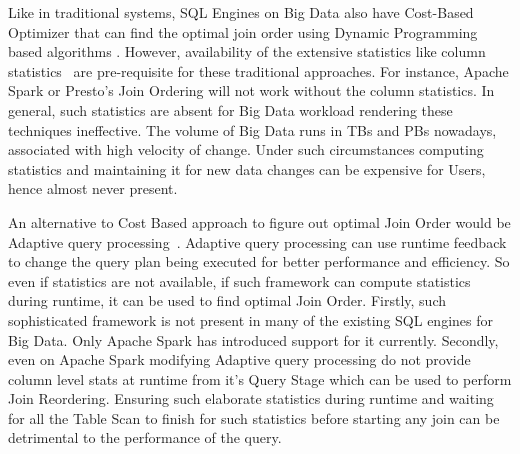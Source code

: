 \documentclass[conference]{IEEEtran}
\begin{document}
Like in traditional systems, SQL Engines on Big Data also have Cost-Based Optimizer that can find the optimal join order using Dynamic Programming based algorithms \cite{b1}. However, availability of the extensive statistics like column statistics~\cite{b11} are pre-requisite for these traditional approaches. For instance, Apache Spark or Presto's Join Ordering will not work without the column statistics. In general, such statistics are absent for Big Data workload rendering these techniques ineffective. The volume of Big Data runs in TBs and PBs nowadays, associated with high velocity of change. Under such circumstances  computing statistics and maintaining it for new data changes can be expensive for Users, hence almost never present.

An alternative to Cost Based approach to figure out optimal Join Order would be Adaptive query processing~\cite{b12}. Adaptive query processing can use runtime feedback to change the query plan being executed for better performance and efficiency. So even if statistics are not available, if such framework can compute statistics during runtime, it can be used to find optimal Join Order.
Firstly, such sophisticated framework is not present in many of the existing SQL engines for Big Data. Only Apache Spark has introduced support for it currently.  Secondly, 
even on Apache Spark modifying Adaptive query processing  do not provide column level stats at runtime from it's Query Stage which can be used to perform Join Reordering. Ensuring such elaborate statistics during runtime and waiting for all the Table Scan to finish for such statistics before starting any join can be detrimental to the performance of the query.
\end{document}
